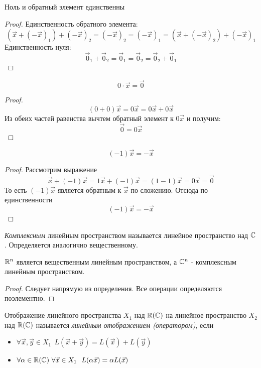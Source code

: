 \begin{proposition}
	Ноль и обратный элемент единственны
\end{proposition}

\begin{proof}
	Единственность обратного элемента:
	\[
		(\vec{x} + (-\vec{x})_1) + (-\vec{x})_2 = (-\vec{x})_2 = (-\vec{x})_1 = (\vec{x} + (-\vec{x})_2) + (-\vec{x})_1
	\]
	Единственность нуля:
	\[
		\vec{0}_1 + \vec{0}_2 = \vec{0}_1 = \vec{0}_2 = \vec{0}_2 + \vec{0}_1
	\]
\end{proof}

\begin{proposition}
	\[
		0 \cdot \vec{x} = \vec{0}
	\]
\end{proposition}

\begin{proof}
	\[
		(0 + 0)\vec{x} = 0\vec{x} = 0\vec{x} + 0\vec{x}
	\]
	Из обеих частей равенства вычтем обратный элемент к $0\vec{x}$ и получим:
	\[
		\vec{0} = 0\vec{x}
	\]
\end{proof}

\begin{proposition}
	\[
		(-1)\vec{x} = -\vec{x}
	\]
\end{proposition}

\begin{proof}
	Рассмотрим выражение
	\[
		\vec{x} + (-1)\vec{x} = 1\vec{x} + (-1)\vec{x} = (1 - 1)\vec{x} = 0\vec{x} = \vec{0}
	\]
	То есть $(-1)\vec{x}$ является обратным к $\vec{x}$ по сложению. Отсюда по единственности
	\[
		(-1)\vec{x} = -\vec{x}
	\]
\end{proof}

\begin{definition}
	\textit{Комплексным} линейным пространством называется линейное пространство над $\mathbb{C}$. Определяется аналогично вещественному.
\end{definition}

\begin{lemma}
	$\mathbb{R}^n$ является вещественным линейным пространством, а $\mathbb{C}^n$ - комплексным линейным пространством.
\end{lemma}

\begin{proof}
	Следует напрямую из определения. Все операции определяются поэлементно.
\end{proof}

\begin{definition}
	Отображение линейного пространства $X_1$ над $\mathbb{R}(\mathbb{C})$ на линейное пространство $X_2$ над $\mathbb{R}(\mathbb{C})$ называется \textit{линейным отображением (оператором)}, если
	\begin{itemize}
		\item $\forall \vec{x}, \vec{y} \in X_1\ \ L(\vec{x} + \vec{y}) = L(\vec{x}) + L(\vec{y})$
		
		\item $\forall \alpha \in \mathbb{R}(\mathbb{C})\ \forall \vec{x} \in X_1\ \ L(\alpha \vec{x}) = \alpha L(\vec{x})$
	\end{itemize}
\end{definition}

